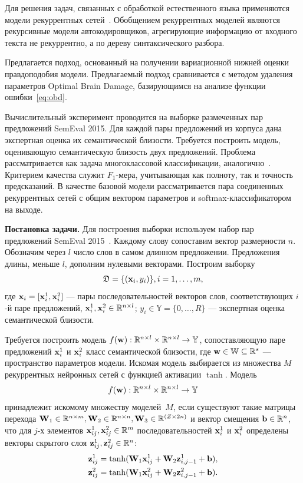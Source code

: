 Для решения задач, связанных с обработкой естественного языка применяются модели рекуррентных сетей~\cite{siamese}. Обобщением рекуррентных моделей являются рекурсивные модели автокодировщиков, агрегирующие информацию от  входного текста не рекуррентно, а по дереву синтаксического разбора.

Предлагается подход, основанный на получении вариационной нижней оценки правдоподобия модели. Предлагаемый подход сравнивается с методом удаления параметров Optimal Brain Damage, базирующимся на анализе функции ошибки~\eqref{eq:obd}. 

Вычислительный эксперимент проводится на выборке размеченных пар предложений SemEval 2015. Для каждой пары предложений из корпуса дана экспертная оценка их семантической близости. Требуется построить модель, оценивающую семантическую близость двух предложений. Проблема рассматривается как задача многоклассовой классификации, аналогично~\cite{sanborn}. Критерием качества служит $F_1$-мера, учитывающая как полноту, так и точность предсказаний.
В качестве базовой модели рассматривается пара соединенных рекуррентных сетей с общим вектором параметров и softmax-классификатором на выходе.

\textbf{Постановка задачи. }
Для построения выборки используем набор пар предложений SemEval 2015~\cite{semeval2015}.
Каждому слову сопоставим вектор размерности $n$.
Обозначим через $l$ число слов в самом длинном предложении. Предложения длины, меньше $l$, дополним нулевыми векторами. 
Построим выборку
$$ {\mathfrak{D}} = \{({\textbf{x}}_i,y_i)\}, i = 1,\dots,m,$$
где ${\textbf{x}}_i = [{\textbf{x}}_i^1,{\textbf{x}}_i^2]$ --- пары последовательностей векторов слов, соответствующих $i$-й паре предложений, ${\textbf{x}}_i^1, {\textbf{x}}_i^2 \in \mathbb{R}^{n\times l}$;
$y_i \in \mathbb{Y} = \{0,\dots,R\}$ --- экспертная оценка семантической близости. 

Требуется построить модель $f({\textbf{w}}): \mathbb{R}^{n\times l} \times \mathbb{R}^{n\times l} \to \mathbb{Y}$, сопоставляющую паре предложений ${\textbf{x}}_i^1$ и ${\textbf{x}}_i^2$ класс семантической близости, где ${\textbf{w}} \in {\mathbb{W}}\subseteq\mathbb{R}^s$ --- пространство параметров модели.
Искомая модель выбирается из множества $M$ рекуррентных нейронных сетей с функцией активации $\tanh$. Модель 
\[
f({\textbf{w}}): \mathbb{R}^{n\times l} \times \mathbb{R}^{n\times l} \to \mathbb{Y}
\]
принадлежит искомому множеству моделей~$M$, если существуют такие матрицы перехода $\mathbf{W}_1\in \mathbb{R}^{n\times m}, \mathbf{W}_2\in \mathbb{R}^{n\times n}, \mathbf{W}_3\in \mathbb{R}^{(Z \times 2n)}$ и вектор смещения ${\textbf{b}} \in \mathbb{R}^{n}$, что для $j$-х элементов ${\textbf{x}}_{ij}^1, {\textbf{x}}_{ij}^2 \in \mathbb{R}^m$ последовательностей ${\textbf{x}}_i^1$ и ${\textbf{x}}_i^2$ определены векторы скрытого слоя $\mathbf{z}_{ij}^1, \mathbf{z}_{ij}^2 \in \mathbb{R}^{n}$:
\begin{gather}
\mathbf{z}_{ij}^1 = \tanh(\mathbf{W}_1 {\textbf{x}}_{ij}^1 + \mathbf{W}_2 \mathbf{z}_{i,j-1}^1 + {\textbf{b}}),\\
\mathbf{z}_{ij}^2 = \tanh(\mathbf{W}_1 {\textbf{x}}_{ij}^2 + \mathbf{W}_2 \mathbf{z}_{i,j-1}^2 + {\textbf{b}}).
\end{gather}

